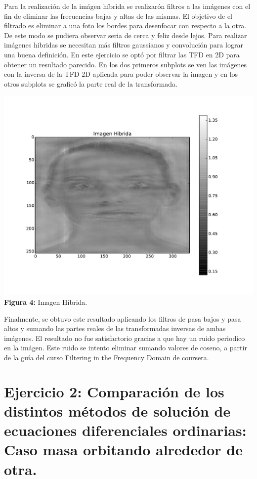 \documentclass[11pt,letterpaper]{exam}
\begin{document}
{Para la realizaci\'on de la im\'agen h\'ibrida se realizar\'on filtros a las im\'agenes con el fin de eliminar las frecuencias bajas y altas de las mismas. El objetivo de el filtrado es eliminar a una foto los bordes para desenfocar con respecto a la otra. De este modo se pudiera observar seria de cerca y feliz desde lejos. Para realizar im\'agenes hibridas se necesitan m\'as filtros gaussianos y convoluci\'on para lograr una buena definici\'on. En este ejercicio se opt\'o por filtrar las TFD en 2D para obtener un resultado parecido. En los dos primeros subplots se ven las im\'agenes con la inversa de la TFD 2D aplicada para poder observar la imagen y en los otros subplots se grafic\'o la parte real de la transformada.}

\begin{center}
\includegraphics[width=16.cm]{ImHybrid.pdf}
\textbf{Figura 4:}{ Imagen H\'ibrida.}
\end{center}

{ Finalmente, se obtuvo este resultado aplicando los filtros de pasa bajos y pasa altos y sumando las partes reales de las transformadas inversas de ambas im\'agenes. El resultado no fue satisfactorio gracias a que hay un ruido periodico en la im\'agen. Este ruido se intento eliminar sumando valores de coseno, a partir de la gu\'ia del curso Filtering in the Frequency Domain de coursera.}

\noindent
\section{Ejercicio 2: Comparaci\'on de los distintos m\'etodos de soluci\'on de ecuaciones diferenciales ordinarias: Caso masa orbitando alrededor de otra.}
\end{document}

